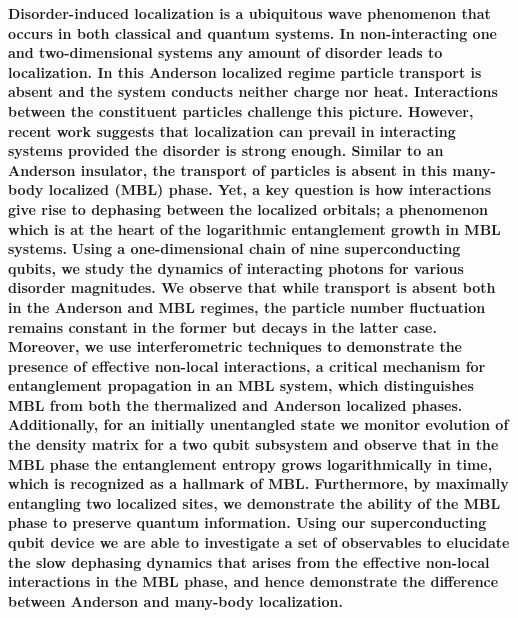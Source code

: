 

\textbf{
    Disorder-induced localization is a ubiquitous wave phenomenon that occurs in both classical and quantum systems.
    In non-interacting one and two-dimensional systems any amount of disorder leads to localization.\autocite{Anderson1958, Abrahams1979}
    In this Anderson localized regime particle transport is absent and the system conducts neither charge nor heat.
    Interactions between the constituent particles challenge this picture. However, recent work suggests that localization can prevail in interacting systems provided the disorder is strong enough.\autocite{Nandkishore2015, Altman2015,  Basko2006, Gornyi2005}
    Similar to an Anderson insulator, the transport of particles is absent in this many-body localized (MBL) phase.
    Yet, a key question is how interactions give rise to dephasing between the localized orbitals; a phenomenon which is at the heart of the logarithmic entanglement growth in MBL systems.\autocite{Bardarson2012, Serbyn2013, Huse2014}
}
\textbf{
    Using a one-dimensional chain of nine superconducting qubits\autocite{Neill2018},
    we study the dynamics of interacting photons for various disorder magnitudes. We observe that while transport is absent both in the Anderson and MBL regimes,
    the particle number fluctuation remains constant in the former but decays in the latter case. Moreover, we use interferometric techniques to demonstrate the presence of effective non-local interactions, a critical mechanism for entanglement propagation in an MBL system, which distinguishes MBL from both the thermalized and Anderson localized phases.
    Additionally, for an initially unentangled state we monitor evolution of the density matrix for a two qubit subsystem
    and observe that in the MBL phase the entanglement entropy grows logarithmically in time, which is recognized as a hallmark of MBL.
    Furthermore, by maximally entangling two localized sites, we demonstrate the ability of the MBL phase to preserve quantum information.
    Using our superconducting qubit device we are able to investigate a set of observables to elucidate the slow dephasing dynamics that arises from the effective non-local interactions in the MBL phase, and hence
    demonstrate the difference between Anderson and many-body localization.}

